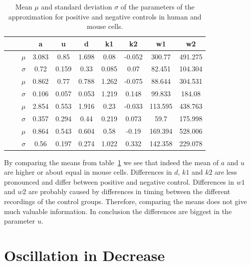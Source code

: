 \begin{table}[h]
	\centering
	\begin{tabular}{|c|c|c|c|c|c|c|c|c|c|}
		\hline
		& & & a & u & d & k1 & k2 & w1 & w2\\
		\hline
		\multirow{4}{*}{\rotatebox[origin=c]{90}{mouse}} & \multirow{2}{*}{\rotatebox[origin=c]{90}{pos}} & $\mu$ & 3.083 & 0.85 & 1.698 & 0.08 & -0.052 & 300.77 & 491.275\\
		\cline{3-10}
		& & $\sigma$ & 0.72 & 0.159 & 0.33 & 0.085 & 0.07 & 82.451 & 104.304\\
		\cline{2-10}
		& \multirow{2}{*}{\rotatebox[origin=c]{90}{neg}} & $\mu$ & 0.862 & 0.77 & 0.788 & 1.262 & -0.075 & 88.644 & 304.531\\
		\cline{3-10}
		& & $\sigma$ & 0.106 & 0.057 & 0.053 & 1.219 & 0.148 & 99.833 & 184.08\\
		\hline
		\multirow{4}{*}{\rotatebox[origin=c]{90}{human}} & \multirow{2}{*}{\rotatebox[origin=c]{90}{pos}} & $\mu$ & 2.854 & 0.553 &  1.916 & 0.23 & -0.033 & 113.595 & 438.763\\
		\cline{3-10}
		& & $\sigma$ & 0.357 & 0.294 & 0.44 & 0.219 & 0.073 & 59.7 & 175.998\\
		\cline{2-10}
		& \multirow{2}{*}{\rotatebox[origin=c]{90}{neg}} & $\mu$ & 0.864 & 0.543 & 0.604 & 0.58 & -0.19 & 169.394 & 528.006 \\
		\cline{3-10}
		& & $\sigma$ & 0.56 & 0.197 & 0.274 & 1.022 & 0.332 & 142.358 & 229.078 \\
		\hline
	\end{tabular}
	\caption{Mean $\mu$ and standard deviation $\sigma$ of the parameters of the approximation for positive and negative controls in human and mouse cells.}
	\label{tab:mean_std_parameters}
\end{table}

By comparing the means from table~\ref{tab:mean_std_parameters} we see that indeed the mean of $a$ and $u$ are higher or about equal in mouse cells. Differences in $d$, $k1$ and $k2$ are less pronounced and differ between positive and negative control. Differences in $w1$ and $w2$ are probably caused by differences in timing between the different recordings of the control groups. Therefore, comparing the means does not give much valuable information. In conclusion the differences are biggest in the parameter $u$.

\section{Oscillation in Decrease}
\label{sec:oscillation_in_decrease}

